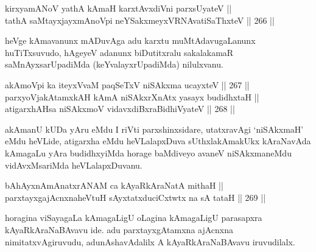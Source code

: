 \begin{shl}
kirxyamANoV yathA kAmaH karxtAvxdiVni parxsUyateV || \\
tathA saMtayxjayxmAnoV\s pi neYSakxmeyxVRNAvatiSaThxteV \hfill || 266 ||  
\end{shl}

\begin{artha}
heVge kAmavanunx mADuvAga adu karxtu muMtAdavugaLanunx huTiTxsuvudo,
hAgeyeV adanunx biDutitxralu sakalakamaR saMnAyxsarUpadiMda
(keYvalayxrUpadiMda) nilulxvanu.
\end{artha}


\begin{shl}
akAmoV\s pi ka iteyxVvaM paqSeTxV niSAkxma ucayxteV \hfill || 267 ||  \\
parxyoVjakAtamxkAH kAmA niSAkxrXnAtx yasayx budidhxtaH || \\
atigarxhAH\footnotemark[2] sa niSAkxmoV vidavxdiBxraBidhiVyateV \hfill || 268 ||  
\end{shl}

\begin{artha}
akAmanU kUDa yAru eMdu I riVti parxshinxsidare, utatxravAgi
`niSAkxmaH' eMdu heVLide, atigarxha eMdu heVLalapxDuva sUthxlakAmakUkx
kAraNavAda kAmagaLu yAra budidhxyiMda horage baMdiveyo avaneV
niSAkxmaneMdu vidAvxMsariMda heVLalapxDuvanu.
\end{artha}

\begin{shl}
bAhAyxnAmAnatxrANAM ca kAyaRkAraNatA mithaH || \\
parxtayxgajAcnxnaheVtuH sAyxtatxduciCxtwtx na sA tataH \hfill || 269 ||  
\end{shl}

\begin{artha}
horagina viSayagaLa kAmagaLigU oLagina kAmagaLigU parasapxra
kAyaRkAraNaBAvavu ide. adu parxtayxgAtamxna ajAcnxna
nimitatxvAgiruvudu, adunAshavAdalilx A kAyaRkAraNaBAvavu iruvudilalx.
\end{artha}


